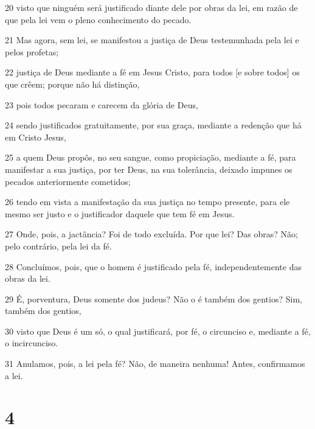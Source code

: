 \par 20 visto que ninguém será justificado diante dele por obras da lei, em razão de que pela lei vem o pleno conhecimento do pecado.
\par 21 Mas agora, sem lei, se manifestou a justiça de Deus testemunhada pela lei e pelos profetas;
\par 22 justiça de Deus mediante a fé em Jesus Cristo, para todos [e sobre todos] os que crêem; porque não há distinção,
\par 23 pois todos pecaram e carecem da glória de Deus,
\par 24 sendo justificados gratuitamente, por sua graça, mediante a redenção que há em Cristo Jesus,
\par 25 a quem Deus propôs, no seu sangue, como propiciação, mediante a fé, para manifestar a sua justiça, por ter Deus, na sua tolerância, deixado impunes os pecados anteriormente cometidos;
\par 26 tendo em vista a manifestação da sua justiça no tempo presente, para ele mesmo ser justo e o justificador daquele que tem fé em Jesus.
\par 27 Onde, pois, a jactância? Foi de todo excluída. Por que lei? Das obras? Não; pelo contrário, pela lei da fé.
\par 28 Concluímos, pois, que o homem é justificado pela fé, independentemente das obras da lei.
\par 29 É, porventura, Deus somente dos judeus? Não o é também dos gentios? Sim, também dos gentios,
\par 30 visto que Deus é um só, o qual justificará, por fé, o circunciso e, mediante a fé, o incircunciso.
\par 31 Anulamos, pois, a lei pela fé? Não, de maneira nenhuma! Antes, confirmamos a lei.

\chapter{4}


